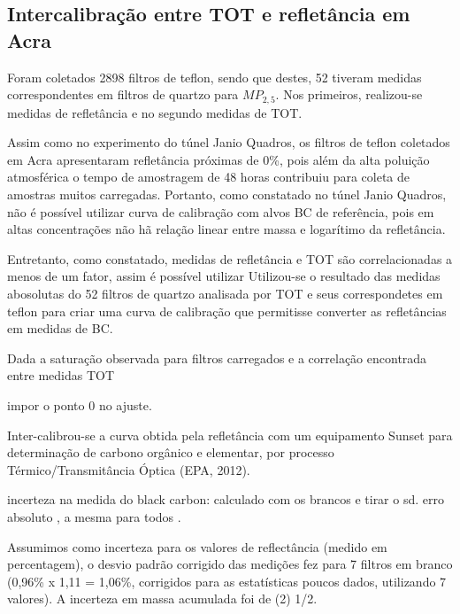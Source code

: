 \subsection{Intercalibração entre TOT e refletância em Acra}

Foram coletados 2898 filtros de teflon, sendo que destes, 52 tiveram medidas
correspondentes em filtros de quartzo para $MP_{2,5}$. Nos primeiros, 
realizou-se medidas de refletância e no segundo medidas de TOT.

Assim como no experimento do túnel Janio Quadros, os filtros de teflon 
coletados em Acra apresentaram refletância próximas de 0\%, pois além 
da alta poluição atmosférica o tempo de amostragem de 48 horas contribuiu 
para coleta de amostras muitos carregadas. 
Portanto, como constatado no túnel Janio Quadros, não é possível utilizar 
curva de calibração com alvos BC de referência, pois em altas concentrações
não hã relação linear entre massa e logarítimo da refletância.

Entretanto, como constatado, medidas de refletância e TOT são correlacionadas 
a menos de um fator, assim é possível utilizar 
Utilizou-se o resultado das medidas abosolutas do 52 filtros de quartzo
analisada por TOT e seus correspondetes em teflon para criar uma curva de 
calibração que permitisse converter as refletâncias em medidas de BC.

Dada a saturação observada para filtros carregados e a correlação encontrada entre medidas TOT 

impor o ponto 0 no ajuste.


 

Inter-calibrou-se a curva obtida pela refletância com um equipamento %
Sunset para determinação de carbono orgânico e elementar, 
por processo Térmico/Transmitância Óptica (EPA, 2012).

incerteza na medida do black carbon: calculado com os brancos e tirar o sd. 
erro absoluto , a mesma para todos .

Assumimos como incerteza para os valores de reflectância (medido em percentagem),
o desvio padrão corrigido das medições fez para 7 filtros em branco 
(0,96\% x 1,11 = 1,06\%, corrigidos para as estatísticas poucos dados, 
utilizando 7 valores). 
A incerteza em massa acumulada foi de (2) 1/2. 

